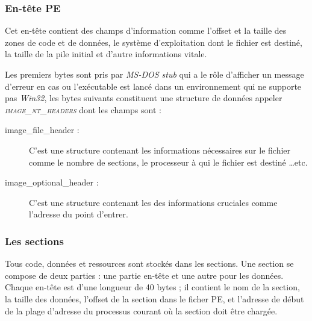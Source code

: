     \subsubsection{En-tête PE}
    Cet en-tête contient des champs d'information comme l'offset et la taille des zones de code et de données, 
    le système d'exploitation dont le fichier est destiné, la taille de la pile initial et 
    d'autre informations vitale. \cite{pe3} %

    Les premiers bytes sont pris par \emph{MS-DOS stub} qui a le rôle d'afficher un message d'erreur en cas ou 
    l'exécutable est lancé dans un environnement qui ne supporte pas \emph{Win32}, les bytes suivants constituent 
    une structure de données appeler \emph{\textsc{image\_nt\_headers}} dont les champs sont : %
    \begin{description}
        \item[image\_file\_header :] C'est une structure contenant les informations nécessaires
            sur le fichier comme le nombre de sections, le processeur à qui le fichier est destiné \ldots etc. %
        \item[image\_optional\_header :] C'est une structure contenant les des informations cruciales comme l'adresse
            du point d'entrer. %
    \end{description}

    \subsubsection{Les sections}
    Tous code, données et ressources sont stockés dans les sections. Une section se compose de deux 
    parties : une partie en-tête et une autre pour les données. Chaque en-tête est d'une longueur de 40 
    bytes ; il contient le nom de la section, la taille des données, l'offset de la section dans 
    le ficher PE, et l'adresse de début de la plage d'adresse du processus courant où la section doit être 
    chargée. \cite{pe4}


